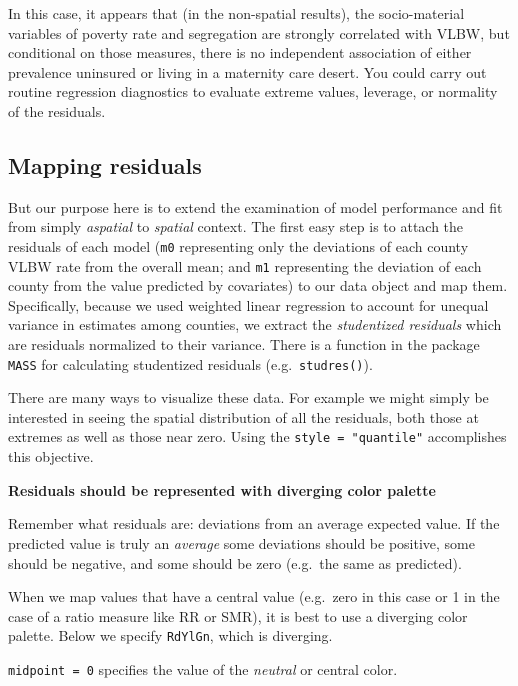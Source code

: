 \documentclass[
]{book}
\newenvironment{Shaded}{\begin{snugshade}}{\end{snugshade}}
\newcommand{\FunctionTok}[1]{\textcolor[rgb]{0.13,0.29,0.53}{\textbf{#1}}}
\newcommand{\NormalTok}[1]{#1}
\newcommand{\OtherTok}[1]{\textcolor[rgb]{0.56,0.35,0.01}{#1}}
\newcommand{\SpecialCharTok}[1]{\textcolor[rgb]{0.81,0.36,0.00}{\textbf{#1}}}
\newenvironment{rmdtip}[1]
  {
  \begin{itemize}
  \renewcommand{\labelitemi}{
    \raisebox{-.7\height}[0pt][0pt]{
      {\setkeys{Gin}{width=3em,keepaspectratio}\texttt{[image: images/\#1]}}
    }
  }
  \setlength{\fboxsep}{1em}
  \begin{tip}
  \item
  }
  {
  \end{tip}
  \end{itemize}
  }
\begin{document}
In this case, it appears that (in the non-spatial results), the socio-material variables of poverty rate and segregation are strongly correlated with VLBW, but conditional on those measures, there is no independent association of either prevalence uninsured or living in a maternity care desert. You could carry out routine regression diagnostics to evaluate extreme values, leverage, or normality of the residuals.

\hypertarget{mapping-residuals}{%
\subsection{Mapping residuals}\label{mapping-residuals}}

But our purpose here is to extend the examination of model performance and fit from simply \emph{aspatial} to \emph{spatial} context. The first easy step is to attach the residuals of each model (\texttt{m0} representing only the deviations of each county VLBW rate from the overall mean; and \texttt{m1} representing the deviation of each county from the value predicted by covariates) to our data object and map them. Specifically, because we used weighted linear regression to account for unequal variance in estimates among counties, we extract the \emph{studentized residuals} which are residuals normalized to their variance. There is a function in the package \texttt{MASS} for calculating studentized residuals (e.g.~\texttt{studres()}).

\begin{Shaded}
\end{Shaded}

There are many ways to visualize these data. For example we might simply be interested in seeing the spatial distribution of all the residuals, both those at extremes as well as those near zero. Using the \texttt{style\ =\ "quantile"} accomplishes this objective.

\begin{rmdtip}{tip}
\textbf{Residuals should be represented with diverging color palette}

Remember what residuals are: deviations from an average expected value. If the predicted value is truly an \emph{average} some deviations should be positive, some should be negative, and some should be zero (e.g.~the same as predicted).

When we map values that have a central value (e.g.~zero in this case or 1 in the case of a ratio measure like RR or SMR), it is best to use a diverging color palette. Below we specify \texttt{RdYlGn}, which is diverging.

\texttt{midpoint\ =\ 0} specifies the value of the \emph{neutral} or central color.

\end{rmdtip}
\end{document}
